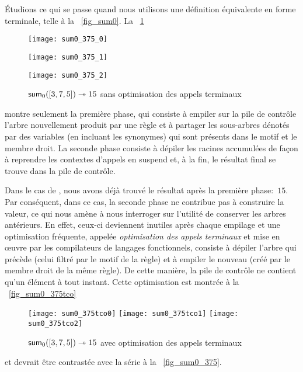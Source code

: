 Étudions ce qui se passe quand nous utilisons une définition
équivalente en forme terminale, telle  à la
\fig~\vref{fig_sum0}. La \fig~\ref{fig_sum0_375}
\begin{figure}[!t]
\centering
\texttt{[image: sum0\_375\_0]}

\texttt{[image: sum0\_375\_1]}

\texttt{[image: sum0\_375\_2]}
\caption{\(\textsf{sum}_0([3,7,5]) \twoheadrightarrow 15\)
sans optimisation des appels terminaux\label{fig_sum0_375}}
\end{figure}
montre seulement la première phase, qui consiste à empiler sur la pile
de contrôle l'arbre nouvellement produit par une règle et à partager
les sous-arbres dénotés par des variables (en incluant les synonymes)
qui sont présents dans le motif et le membre droit. La seconde phase
consiste à dépiler les racines accumulées de façon à reprendre les
contextes d'appels en suspend et, à la fin, le résultat final se
trouve dans la pile de contrôle.

Dans le cas de , nous avons déjà trouvé le résultat
après la première phase:~\(15\). Par conséquent, dans ce cas, la
seconde phase ne contribue pas à construire la valeur, ce qui nous
amène à nous interroger sur l'utilité de conserver les arbres
antérieurs. En effet, ceux-ci deviennent inutiles après chaque
empilage et une optimisation fréquente, appelée \emph{optimisation des
  appels terminaux} et mise en {\oe}uvre par les compilateurs de
langages fonctionnels, consiste à dépiler l'arbre qui précède (celui
filtré par le motif de la règle) et à empiler le nouveau (créé par le
membre droit de la même règle). De cette manière, la pile de contrôle
ne contient qu'un élément à tout instant. Cette optimisation est
montrée à la \fig~\vref{fig_sum0_375tco}
\begin{figure}[!t]
\centering
\texttt{[image: sum0\_375tco0]}
\texttt{[image: sum0\_375tco1]}
\texttt{[image: sum0\_375tco2]}
\caption{\(\textsf{sum}_0([3,7,5])
  \twoheadrightarrow 15\) avec optimisation des appels terminaux
  \label{fig_sum0_375tco}}
\end{figure}
et devrait être contrastée avec la série à la \fig~\vref{fig_sum0_375}.

